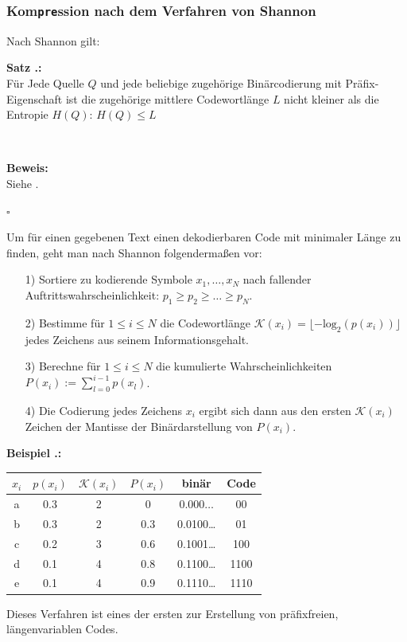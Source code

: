 \documentclass[a4paper,12pt]{article}
\newcounter{Beispiel}
\newcounter{Satz}
\newenvironment{Satz}{
\medskip
        
        \setlength{\parindent}{0pt}
        \addtocounter{Satz}{1}
        \textbf{\textsf{Satz \thesubsection.\theSatz}:}\\}{
        \nopagebreak
        \vspace{-1.0ex}
        \bigskip\\
        
}
\newenvironment{Beispiel}{
\medskip
        
        \setlength{\parindent}{0pt}
        \addtocounter{Beispiel}{1}
        \textbf{\textsf{Beispiel \thesubsection.\theBeispiel}:}\\}{
        \nopagebreak
        \vspace{-1.0ex}
        \bigskip
        
}
\newenvironment{proof}{
\bigskip
        
        \setlength{\parindent}{0pt}
        \textbf{Beweis:}\\}{
        \nopagebreak
        \vspace{-1.0ex}
        \begin{flushright}
             $\square$
        \end{flushright}
        \bigskip
        
}
\begin{document}
\subsubsection{Kom{\tt{pre}}ssion nach dem Verfahren von Shannon}
Nach Shannon gilt:
\begin{Satz}
Für Jede Quelle $Q$ und jede beliebige zugehörige Binärcodierung mit 
Präfix-Eigenschaft ist die zugehörige mittlere Codewortlänge $L$ 
nicht kleiner als die Entropie $H(Q)$: $H(Q)\leq L$
\end{Satz}
\begin{proof}
Siehe \cite{Rohling}.
\end{proof}
Um für einen gegebenen Text einen dekodierbaren Code mit minimaler Länge zu finden, geht man nach Shannon folgendermaßen vor:
\begin{itemize}
	\item[1)]  Sortiere zu kodierende Symbole $x_{1},\ldots,x_{N}$ nach fallender Auftrittswahrscheinlichkeit: 
$p_{1}\geq p_{2}\geq\ldots\geq p_{N}$.
	\item[2)] Bestimme für $1\leq i \leq N$ die Codewortlänge $\mathcal{K}(x_{i}) = \lfloor -\text{log}_2(p(x_{i}))\rfloor$ jedes Zeichens aus seinem Informationsgehalt.
	\item[3)] Berechne für $1\leq i \leq N$ die kumulierte Wahrscheinlichkeiten $P(x_{i}):=\sum_{l=0}^{i-1}p(x_{l})$.
	\item[4)] Die Codierung jedes Zeichens $x_{i}$ ergibt sich dann aus den ersten $\mathcal{K}(x_{i})$ Zeichen der Mantisse der Binärdarstellung von $P(x_{i})$.
\end{itemize}
\begin{Beispiel}

\begin{center}
\begin{tabular}{c|c|c|c|c|c}
$x_{i}$ & $p(x_{i})$ & $\mathcal{K}(x_{i})$ & $P(x_{i})$ & binär & Code
\\
\hline
a & 0.3 & 2 & 0 & $0.000\ldots$ & 00
\\
\hline
b & 0.3  & 2 & 0.3 & 0.0100\ldots & 01
\\
\hline
c & 0.2  & 3 & 0.6 & 0.1001\ldots & 100
\\
\hline
d & 0.1  & 4 & 0.8 & 0.1100\ldots & 1100
\\
\hline
e & 0.1  & 4 & 0.9 & 0.1110\ldots & 1110
\end{tabular}
\end{center}
\end{Beispiel}
Dieses Verfahren ist eines der ersten zur Erstellung von präfixfreien, längenvariablen Codes.
\end{document}
